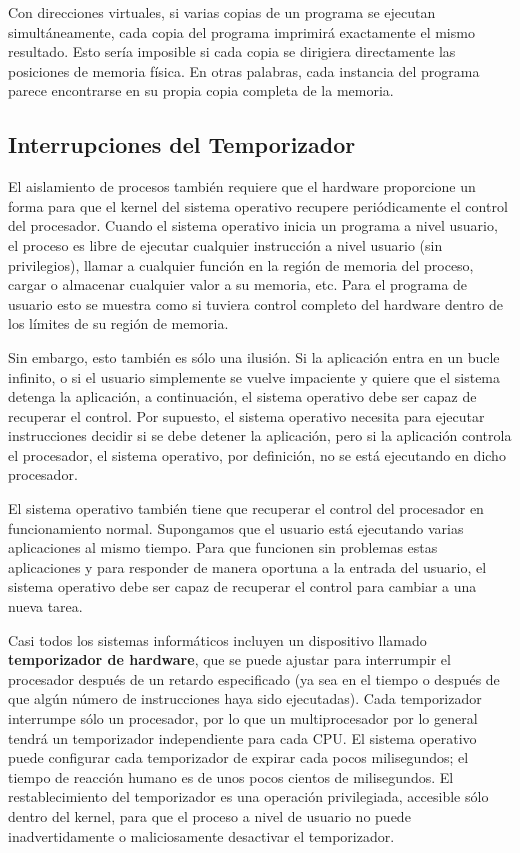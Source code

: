 \documentclass[10pt]{book}
\begin{document}
Con direcciones virtuales, si varias copias de un programa se ejecutan simultáneamente, cada copia del programa imprimirá exactamente el mismo resultado. Esto sería imposible si cada copia se dirigiera directamente las posiciones de memoria física. En otras palabras, cada instancia del programa parece encontrarse en su propia copia completa de la memoria.


\subsection{Interrupciones del Temporizador}
El aislamiento de procesos también requiere que el hardware proporcione un forma para que el kernel del sistema operativo recupere periódicamente el control del procesador. Cuando el sistema operativo inicia un programa a nivel usuario, el proceso es libre de ejecutar cualquier instrucción a nivel usuario (sin privilegios), llamar a cualquier función en la región de memoria del proceso, cargar o almacenar cualquier valor a su memoria, etc. Para el programa de usuario esto se muestra como si tuviera control completo del hardware dentro de los límites de su región de memoria.

Sin embargo, esto también es sólo una ilusión. Si la aplicación entra en un bucle infinito, o si el usuario simplemente se vuelve impaciente y quiere que el sistema detenga la aplicación, a continuación, el sistema operativo debe ser capaz de recuperar el control. Por supuesto, el sistema operativo necesita para ejecutar instrucciones decidir si se debe detener la aplicación, pero si la aplicación controla el procesador, el sistema operativo, por definición, no se está ejecutando en dicho procesador.

El sistema operativo también tiene que recuperar el control del procesador en funcionamiento normal. Supongamos que el usuario está ejecutando varias aplicaciones al mismo tiempo. Para que funcionen sin problemas estas aplicaciones y para responder de manera oportuna a la entrada del usuario, el sistema operativo debe ser capaz de recuperar el control para cambiar a una nueva tarea.

Casi todos los sistemas informáticos incluyen un dispositivo llamado \textbf{temporizador de hardware}, que se puede ajustar para interrumpir el procesador después de un retardo especificado (ya sea en el tiempo o después de que algún número de instrucciones haya sido ejecutadas). Cada temporizador interrumpe sólo un procesador, por lo que un multiprocesador por lo general tendrá un temporizador independiente para cada CPU. El sistema operativo puede configurar cada temporizador de expirar cada pocos milisegundos; el tiempo de reacción humano es de unos pocos cientos de milisegundos. El restablecimiento del temporizador es una operación privilegiada, accesible sólo dentro del kernel, para que el proceso a nivel de usuario no puede inadvertidamente o maliciosamente desactivar el temporizador.
\end{document}

